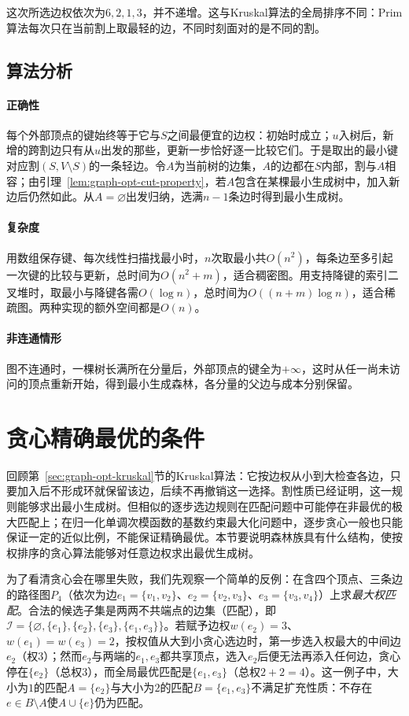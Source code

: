 这次所选边权依次为$6,2,1,3$，并不递增。这与Kruskal算法的全局排序不同：Prim算法每次只在当前割上取最轻的边，不同时刻面对的是不同的割。

\FloatBarrier
\subsection{算法分析}

\paragraph{正确性}
每个外部顶点的键始终等于它与$S$之间最便宜的边权：初始时成立；$u$入树后，新增的跨割边只有从$u$出发的那些，更新一步恰好逐一比较它们。于是取出的最小键对应割$(S,V\setminus S)$的一条轻边。令$A$为当前树的边集，$A$的边都在$S$内部，割与$A$相容；由引理~\ref{lem:graph-opt-cut-property}，若$A$包含在某棵最小生成树中，加入新边后仍然如此。从$A=\varnothing$出发归纳，选满$n-1$条边时得到最小生成树。

\paragraph{复杂度}
用数组保存键、每次线性扫描找最小时，$n$次取最小共$O(n^2)$，每条边至多引起一次键的比较与更新，总时间为$O(n^2+m)$，适合稠密图。用支持降键的索引二叉堆时，取最小与降键各需$O(\log n)$，总时间为$O((n+m)\log n)$，适合稀疏图。两种实现的额外空间都是$O(n)$。

\paragraph{非连通情形}
图不连通时，一棵树长满所在分量后，外部顶点的键全为$+\infty$，这时从任一尚未访问的顶点重新开始，得到最小生成森林，各分量的父边与成本分别保留。

\section{贪心精确最优的条件}
\label{sec:mst-greedy-matroid}

回顾第~\ref{sec:graph-opt-kruskal}节的Kruskal算法：它按边权从小到大检查各边，只要加入后不形成环就保留该边，后续不再撤销这一选择。割性质已经证明，这一规则能够求出最小生成树。但相似的逐步选边规则在匹配问题中可能停在非最优的极大匹配上；在归一化单调次模函数的基数约束最大化问题中，逐步贪心一般也只能保证一定的近似比例，不能保证精确最优。本节要说明森林族具有什么结构，使按权排序的贪心算法能够对任意边权求出最优生成树。

为了看清贪心会在哪里失败，我们先观察一个简单的反例：在含四个顶点、三条边的路径图$P_4$（依次为边$e_1=\{v_1,v_2\}$、$e_2=\{v_2,v_3\}$、$e_3=\{v_3,v_4\}$）上求\emph{最大权匹配}。合法的候选子集是两两不共端点的边集（匹配），即$\mathcal I=\{\varnothing,\{e_1\},\{e_2\},\{e_3\},\{e_1,e_3\}\}$。若赋予边权$w(e_2)=3$、$w(e_1)=w(e_3)=2$，按权值从大到小贪心选边时，第一步选入权最大的中间边$e_2$（权$3$）；然而$e_2$与两端的$e_1,e_3$都共享顶点，选入$e_2$后便无法再添入任何边，贪心停在$\{e_2\}$（总权$3$），而全局最优匹配是$\{e_1,e_3\}$（总权$2+2=4$）。这一例子中，大小为$1$的匹配$A=\{e_2\}$与大小为$2$的匹配$B=\{e_1,e_3\}$不满足扩充性质：不存在$e\in B\setminus A$使$A\cup\{e\}$仍为匹配。

